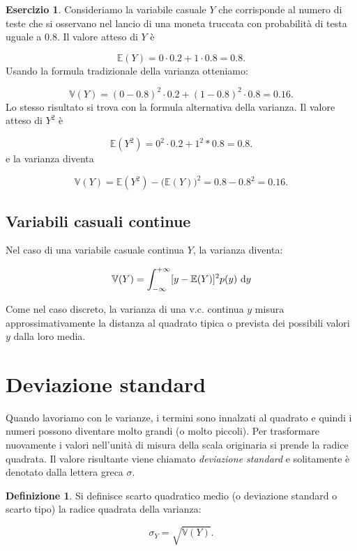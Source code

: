 \documentclass[
  11pt,
]{krantz}
\newcommand{\E}{\mathbb{E}} %
\theoremstyle{definition}
\newtheorem{definition}{Definizione}[chapter]
\theoremstyle{definition}
\theoremstyle{definition}
\newtheorem{exercise}{Esercizio}[chapter]
\theoremstyle{definition}
\theoremstyle{remark}
\begin{document}
\begin{exercise}
Consideriamo la variabile casuale \(Y\) che corrisponde al numero di teste che si osservano nel lancio di una moneta truccata con probabilità di testa uguale a 0.8. Il valore atteso di \(Y\) è

\[
\E(Y) = 0 \cdot 0.2 + 1 \cdot 0.8 = 0.8.
\] Usando la formula tradizionale della varianza otteniamo:

\[
\mathbb{V}(Y) = (0 - 0.8)^2 \cdot 0.2 + (1 - 0.8)^2 \cdot 0.8 = 0.16.
\] Lo stesso risultato si trova con la formula alternativa della varianza. Il valore atteso di \(Y^2\) è

\[
\E(Y^2) = 0^2 \cdot 0.2 + 1^2 * 0.8 = 0.8.
\] e la varianza diventa

\[
\mathbb{V}(Y) = \E(Y^2) - \big(\E(Y) \big)^2 = 0.8 - 0.8^2 = 0.16.
\]
\end{exercise}

\hypertarget{variabili-casuali-continue-1}{%
\subsection{Variabili casuali continue}\label{variabili-casuali-continue-1}}

Nel caso di una variabile casuale continua \(Y\), la varianza diventa:

\begin{equation}
\mathbb{V}(Y) = \int_{-\infty}^{+\infty} \large[y - \E(Y)\large]^2 p(y) \,\operatorname {d}\!y
\label{eq:def-var-rv-cont}
\end{equation}

Come nel caso discreto, la varianza di una v.c. continua \(y\) misura approssimativamente la distanza al quadrato tipica o prevista dei possibili valori \(y\) dalla loro media.

\hypertarget{deviazione-standard}{%
\section{Deviazione standard}\label{deviazione-standard}}

Quando lavoriamo con le varianze, i termini sono innalzati al quadrato e quindi i numeri possono diventare molto grandi (o molto piccoli). Per trasformare nuovamente i valori nell'unità di misura della scala originaria si prende la radice quadrata. Il valore risultante viene chiamato \emph{deviazione standard} e solitamente è denotato dalla lettera greca \(\sigma\).

\begin{definition}
Si definisce scarto quadratico medio (o deviazione standard o scarto tipo) la radice quadrata della varianza:

\begin{equation}
\sigma_Y = \sqrt{\mathbb{V}(Y)}.
\label{eq:def-sd}
\end{equation}
\end{definition}
\end{document}
